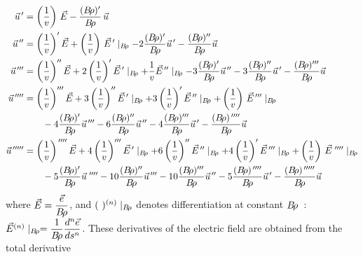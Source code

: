 \begin{equation}
	\begin{aligned}
		\vec  u^{\,\prime} 
		       & =  \left(\dfrac{1}{v}\right)\, \vec  E 
		             - \dfrac{(\Br )^\prime}{\Br} \, \vec  u\\
		\vec u^{\,\prime\prime} 
		       & =  \left(\dfrac{1}{v}\right)^\prime \vec  E 
		            + \left(\dfrac{1}{v}\right)\, \vec  E^{\,\prime} 
		            \mid_{ \Br}  -2 \dfrac{(\Br )^\prime }{ \Br} 
		             \vec  u^{\,\prime} -
		             \dfrac{(\Br)^{\prime\prime}}{\Br}  \vec  u \\
	    \vec  u^{\,\prime\prime\prime} 
	           &  = \left( \dfrac{1}{v}\right)^{\prime\prime}\vec  E
	               +2\left(\dfrac{1}{v}\right)^\prime \vec  E^{\,\prime} 
	               \mid_{ \Br} +\dfrac{1}{v} \vec  E^{\,\prime\prime} 
	               \mid_{ \Br} -3 \dfrac{(\Br )^\prime }{\Br}  \vec  u^{\,\prime\prime} 
	               -3 \dfrac{(\Br )^{\prime\prime}}{\Br}  \vec u^{\,\prime} 
	               - \dfrac{(\Br )^{\prime\prime\prime} }{\Br}  \vec  u \\
		\vec  u^{\quaprime}
		      & =  \left(\dfrac{1}{v}\right)^{\prime\prime\prime}  \vec  E 
		           +3\left(\dfrac{1}{v}\right)^{\prime\prime}\vec E^{\,\prime} \mid_{ \Br} 
		           +3\left( \dfrac{1}{v}\right)^\prime \vec  E^{\,\prime\prime} \mid_{\Br} 
		           +\left(\dfrac{1}{v}\right)\,\vec  E^{\,\prime\prime\prime} \mid_{\Br} \\
		      &  \qquad -4 \dfrac{(\Br )^\prime }{\Br}  \vec  u^{\,\prime\prime\prime} 
		           -6 \dfrac{(\Br )^{\prime\prime}}{\Br}  \vec  u^{\,\prime\prime} 
		           -4 \dfrac{(\Br )^{\prime\prime\prime} }{\Br}  \vec  u^{\,\prime} 
		           - \dfrac{(\Br )^{\quaprime}}{\Br}  \vec  u \\
             \vec  u^{\cinqprime}
		      & =  \left(\dfrac{1}{v}\right)^{\quaprime}  \vec  E 
		           +4\left(\dfrac{1}{v}\right)^{\prime\prime\prime}\vec E^{\,\prime} \mid_{ \Br} 
		           +6\left(\dfrac{1}{v}\right)^{\prime\prime}\vec E^{\,\prime\prime} \mid_{ \Br} 
		           +4\left( \dfrac{1}{v}\right)^\prime \vec  E^{\,\prime\prime\prime} \mid_{\Br} 
		           +\left(\dfrac{1}{v}\right)\,\vec  E^{\,\quaprime} \mid_{\Br} \\
		      &  \qquad -5 \dfrac{(\Br )^\prime }{\Br}  \vec  u^{\,\quaprime} 
		           -10 \dfrac{(\Br )^{\prime\prime}}{\Br}  \vec  u^{\,\prime\prime\prime} 
		           -10 \dfrac{(\Br )^{\prime\prime\prime}}{\Br}  \vec  u^{\,\prime\prime} 
		           -5 \dfrac{(\Br )^{\quaprime} }{\Br}  \vec  u^{\,\prime} 
		           - \dfrac{(\Br )^{\cinqprime}}{\Br}  \vec  u	\end{aligned}
	\label{eq2-2-10}
\end{equation}
%
where $ \vec  E=\dfrac{\vec  e}{B\!\rho} $, and $(~)^{(n)}\mid_{ B\!\rho} $ 
denotes differentiation at constant $ B\!\rho$~:  
$ \vec E^{(n)}\mid_{ B\!\rho} =   \dfrac{ 1}{B\!\rho} \dfrac{d^n\vec  e }{ds^n}$.  
These derivatives of the electric field are obtained from the total derivative

